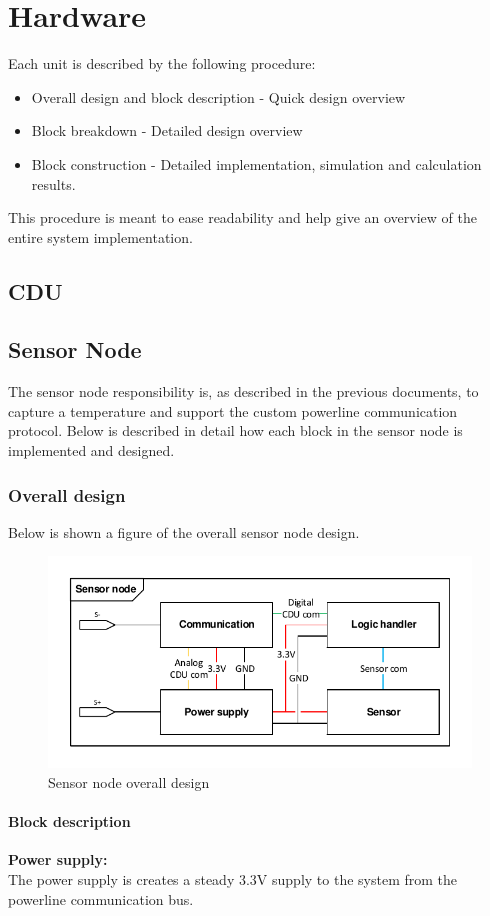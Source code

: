 \chapter{Hardware}
Each unit is described by the following procedure:
\begin{itemize}
\item Overall design and block description - Quick design overview
\item Block breakdown - Detailed design overview
\item Block construction - Detailed implementation, simulation and calculation results.
\end{itemize}
This procedure is meant to ease readability and help give an overview of the entire system implementation.
\section{CDU}

\section{Sensor Node}
The sensor node responsibility is, as described in the previous documents, to capture a temperature and support the custom powerline communication protocol. Below is described in detail how each block in the sensor node is implemented and designed.

\subsection{Overall design}
Below is shown a figure of the overall sensor node design.
\begin{figure}
\centering
\includegraphics[width=.9\textwidth]{billeder/sn_overall_design}
\caption{Sensor node overall design}
\end{figure}

\subsubsection{Block description}
\textbf{Power supply:}\\
The power supply is creates a steady 3.3V supply to the system from the powerline communication bus.\\

